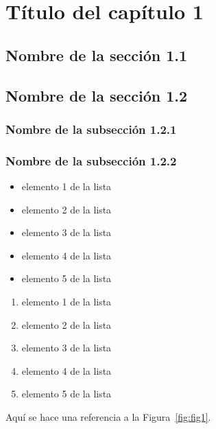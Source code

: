 \chapter{Título del capítulo 1}

\section{Nombre de la sección 1.1}

\lipsum[1-5]

\section{Nombre de la sección 1.2}

\lipsum[8]

\subsection{Nombre de la subsección 1.2.1}

\lipsum[11-12]

\subsection{Nombre de la subsección 1.2.2}

\lipsum[14-15]

\begin{itemize}
    \item elemento 1 de la lista
    \item elemento 2 de la lista
    \item elemento 3 de la lista
    \item elemento 4 de la lista
    \item elemento 5 de la lista
\end{itemize}

\lipsum[17]

\begin{enumerate}
    \item elemento 1 de la lista
    \item elemento 2 de la lista
    \item elemento 3 de la lista
    \item elemento 4 de la lista
    \item elemento 5 de la lista
\end{enumerate}

\lipsum[18]

Aquí se hace una referencia a la Figura~\ref{fig:fig1}.

